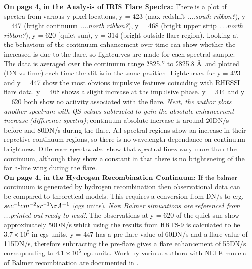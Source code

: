 \documentclass[11pt]{article}
\begin{document}
\textbf{On page 4, in the Analysis of IRIS Flare Spectra: } There is a plot of spectra from various y-pixel locations, y = 423 (max redshift \emph{....south ribbon?}), y = 447 (bright continuum \emph{....north ribbon?}), y = 468 (bright upper strip \emph{....north ribbon?}), y = 620 (quiet sun), y = 314 (bright outside flare region). Looking at the behaviour of the continuum enhancement over time can show whether the increased is due to the flare, so lightcurves are made for each spectral sample. The data is averaged over the continuum range 2825.7 to 2825.8 \AA\ and plotted (DN vs time) each time the slit is in the same position. Lightcurves for y = 423 and y = 447 show the most obvious impulsive features coinciding with RHESSI flare data. y = 468 shows a slight increase at the impulsive phase. y = 314 and y = 620 both show no activity associated with the flare. \emph{Next, the author plots another spectrum with QS values subtracted to gain the absolute enhancement increase (difference spectra)}; continuum absolute increase is around 20DN/s before and 80DN/s during the flare. All spectral regions show an increase in their repective continuum regions, so there is no wavelength dependance on continuum brightness. Difference spectra also show that spectral lines vary more than the continuum, although they show a constant in that there is no brighteneing of the far h-line wing during the flare. \\
\textbf{On page 4, in the Hydrogen Recombination Continuum: } If the balmer continuum is generated by hydrogen recombination then observational data can be compared to theoretical models. This requires a conversion from DN/s to erg.$sec^{-1}cm^{-2}sr^{-1}\AA^{-1}$ (cgs units). \emph{Now Balmer simulations are referenced from \cite{2007ASPC..368..417D}...printed out ready to read!}. The observations at y = 620 of the quiet sun show approximately 50DN/s which using the results from HRTS-9 is calculated to be $3.7{\times}10^{5}$ in cgs units. y = 447 has a pre-flare value of 60DN/s and a flare value of 115DN/s, therefore subtracting the pre-flare gives a flare enhancement of 55DN/s corresponding to $4.1{\times}10^{5}$ cgs units. Work by various authors with NLTE models of Balmer recombination are documented in \cite{2007ASPC..368..417D}. \\
\end{document}
